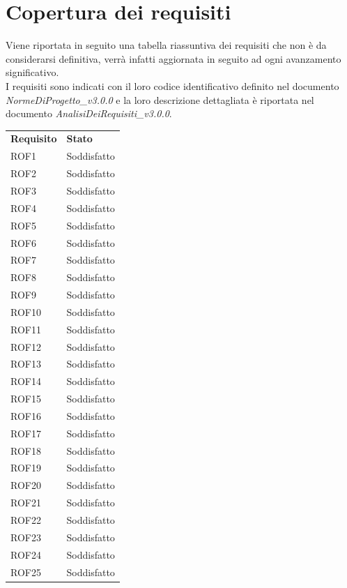 \section{Copertura dei requisiti}
Viene riportata in seguito una tabella riassuntiva dei requisiti che non è da considerarsi definitiva, verrà infatti aggiornata in seguito ad ogni avanzamento significativo. \\
I requisiti sono indicati con il loro codice identificativo definito nel documento \textit{NormeDiProgetto\_v3.0.0} e la loro descrizione dettagliata è riportata nel documento \textit{AnalisiDeiRequisiti\_v3.0.0}.
\begin{longtable}{| p{2.5cm} | p{3cm} |}
	\rowcolor{LightBlue}
	\color{white}\bfseries Requisito & \color{white}\bfseries Stato \\
	ROF1 & Soddisfatto \\ \hline
	ROF2 & Soddisfatto \\ \hline
	ROF3 & Soddisfatto \\ \hline
	ROF4 & Soddisfatto \\ \hline
	ROF5 & Soddisfatto \\ \hline
	ROF6 & Soddisfatto \\ \hline
	ROF7 & Soddisfatto \\ \hline
	ROF8 & Soddisfatto \\ \hline
	ROF9 & Soddisfatto \\ \hline
	ROF10 & Soddisfatto \\ \hline
	ROF11 & Soddisfatto \\ \hline
	ROF12 & Soddisfatto \\ \hline
	ROF13 & Soddisfatto \\ \hline
	ROF14 & Soddisfatto \\ \hline
	ROF15 & Soddisfatto \\ \hline
	ROF16 & Soddisfatto \\ \hline
	ROF17 & Soddisfatto \\ \hline
	ROF18 & Soddisfatto \\ \hline
	ROF19 & Soddisfatto \\ \hline
	ROF20 & Soddisfatto \\ \hline
	ROF21 & Soddisfatto \\ \hline
	ROF22 & Soddisfatto \\ \hline
	ROF23 & Soddisfatto \\ \hline
	ROF24 & Soddisfatto \\ \hline
	ROF25 & Soddisfatto \\ \hline

\end{longtable}
